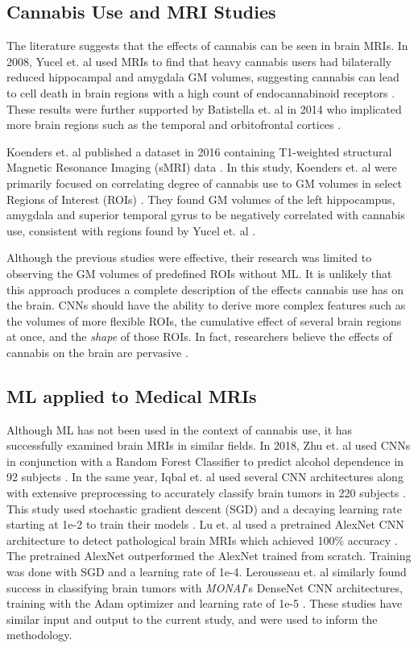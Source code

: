 \documentclass[conference]{IEEEtran}
\begin{document}
\subsection{Cannabis Use and MRI Studies
}

The literature suggests that the effects of cannabis can be seen in brain MRIs. In 2008, Yucel et. al used MRIs to find that heavy cannabis users had bilaterally reduced hippocampal and amygdala GM volumes, suggesting cannabis can lead to cell death in brain regions with a high count of endocannabinoid receptors \cite{b5}. These results were further supported by Batistella et. al in 2014 who implicated more brain regions such as the temporal and orbitofrontal cortices \cite{b6}. 

Koenders et. al published a dataset in 2016 containing T1-weighted structural Magnetic Resonance Imaging (sMRI) data \cite{b7}. In this study, Koenders et. al were primarily focused on correlating degree of cannabis use to GM volumes in select Regions of Interest (ROIs) \cite{b7}. They found GM volumes of the left hippocampus, amygdala and superior temporal gyrus to be negatively correlated with cannabis use, consistent with regions found by Yucel et. al \cite{b7}. 

Although the previous studies were effective, their research was limited to observing the GM volumes of predefined ROIs without ML. It is unlikely that this approach produces a complete description of the effects cannabis use has on the brain. CNNs should have the ability to derive more complex features such as the volumes of more flexible ROIs, the cumulative effect of several brain regions at once, and the \textit{shape} of those ROIs. In fact, researchers believe the effects of cannabis on the brain are pervasive \cite{Occipital}.

\subsection{ML applied to Medical MRIs
}

Although ML has not been used in the context of cannabis use, it has successfully examined brain MRIs in similar fields. In 2018, Zhu et. al used CNNs in conjunction with a Random Forest Classifier to predict alcohol dependence in 92 subjects \cite{b8}. In the same year, Iqbal et. al used several CNN architectures along with extensive preprocessing to accurately classify brain tumors in 220 subjects \cite{Iqbal}. This study used stochastic gradient descent (SGD) and a decaying learning rate starting at 1e-2 to train their models \cite{Iqbal}. Lu et. al used a pretrained AlexNet CNN architecture to detect pathological brain MRIs which achieved 100\% accuracy \cite{Lu}. The pretrained AlexNet outperformed the AlexNet trained from scratch\cite{Lu}. Training was done with SGD and a learning rate of 1e-4\cite{Lu}. Lerousseau et. al similarly found success in classifying brain tumors with \textit{MONAI}'s DenseNet CNN architectures, training with the Adam optimizer and learning rate of 1e-5 \cite{Lerousseau}. These studies have similar input and output to the current study, and were used to inform the methodology. 
\end{document}

